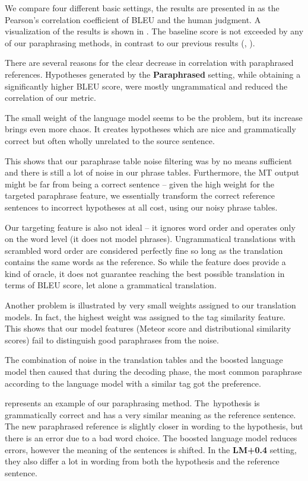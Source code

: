 We compare four different basic settings, the results are presented in 
as the Pearson’s correlation coefficient of BLEU and the human judgment. 
A visualization of the results is shown in . The baseline
score is not exceeded by any of our paraphrasing methods, in contrast to  our previous 
results (\cite{parmesan}, \cite{barancikova:2014}). 

There are several reasons for the clear decrease in correlation with paraphrased 
references. Hypotheses generated by the \textbf{Paraphrased} setting, while obtaining 
a significantly higher BLEU score, were mostly ungrammatical and reduced the 
correlation of our metric.

The small weight of the language model seems to be the problem, but its increase brings
even more chaos. It creates hypotheses which are nice and grammatically correct 
but often wholly unrelated to the source sentence.

This shows that our paraphrase table noise filtering was by no means sufficient and
there is still a lot of noise in our phrase tables. Furthermore, the MT output
might be far from being a correct sentence -- given the high weight for the targeted 
paraphrase feature, we essentially transform the correct reference 
sentences to incorrect hypotheses at all cost, using our noisy phrase tables.

Our targeting feature is also not ideal -- it ignores word order and operates
only on the word level (it does not model phrases). Ungrammatical translations
with scrambled word order are considered perfectly fine so long as the
translation contains the same words as the reference. So while the feature does
provide a kind of oracle, it does not guarantee reaching the best possible
translation in terms of BLEU score, let alone a grammatical translation.

Another problem is illustrated by very small weights assigned to our translation
models. In fact, the highest weight was assigned to the tag similarity feature.
This shows that our model features (Meteor score and distributional
similarity scores) fail to distinguish good paraphrases from the noise. 

The combination of noise in the translation tables and the boosted language
model then caused that during the decoding phase, the most common paraphrase
according to the language model with a similar tag got the preference. 

 represents an example of our paraphrasing method. The~hypothesis is 
grammatically correct and has a very similar meaning as the reference sentence. The 
new paraphrased reference is slightly closer in wording to the hypothesis, but there 
is an error due to a bad word choice. The boosted language model reduces errors, 
however the meaning of the sentences is shifted. In the \textbf{LM+0.4} setting, 
they also differ a lot in wording from both the hypothesis and the reference sentence.


